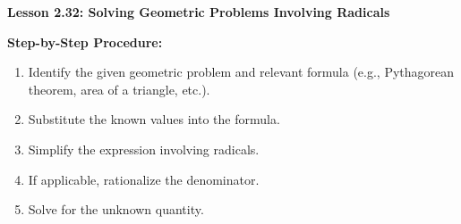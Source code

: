\begin{center}
\textbf{Lesson 2.32: Solving Geometric Problems Involving Radicals}
\end{center}

\vspace*{-1.5ex}

\noindent \textbf{Step-by-Step Procedure:}

\begin{enumerate}
    \item Identify the given geometric problem and relevant formula (e.g., Pythagorean theorem, area of a triangle, etc.).
    \item Substitute the known values into the formula.
    \item Simplify the expression involving radicals.
    \item If applicable, rationalize the denominator.
    \item Solve for the unknown quantity.
\end{enumerate}


